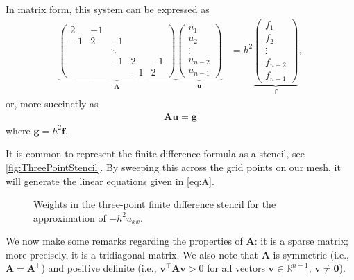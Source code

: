 In matrix form, this system can be expressed as
\begin{align}
 \underbrace{ \begin{pmatrix}
    2 & -1 & & & \\
    -1 & 2 & -1 & & \\
    & & \ddots & & \\
    & & -1 & 2 & -1 \\
    & & & -1 & 2
  \end{pmatrix}
  }_{\bm A}
  \underbrace{ \begin{pmatrix}
    u_1 \\
    u_2 \\
    \vdots \\
    u_{n-2} \\
    u_{n-1}
  \end{pmatrix}
  }_{\bm u}
  &= h^2
  \underbrace{ \begin{pmatrix}
    f_1 \\
    f_2 \\
    \vdots \\
    f_{n-2} \\
    f_{n-1}
  \end{pmatrix}
  }_{\bm f} ,
  \label{eq:A}
\end{align}
or, more succinctly as
\begin{align*}
  \bm A \bm u = \bm g
\end{align*}
where $\bm g = h^2 \bm f$.

It is common to represent the finite difference formula as a stencil, see
\autoref{fig:ThreePointStencil}. By sweeping this across the grid points on our
mesh, it will generate the linear equations given in \eqref{eq:A}.
\begin{figure}
  \centering
  \caption{
    Weights in the three-point finite difference stencil for the approximation
    of $-h^2u_{xx}$.
  }
  \label{fig:ThreePointStencil}
\end{figure}

We now make some remarks regarding the properties of $\bm A$:
it is a sparse matrix;  more precisely, it is a tridiagonal matrix.
We also note that $\bm A$ is symmetric (i.e., $\bm A = \bm A^\intercal$) and
positive definite (i.e., $\bm v^\intercal \bm A \bm v > 0$ for all vectors $\bm
v \in \mathbb{R}^{n-1}$, $\bm v \not= \bm 0$).

